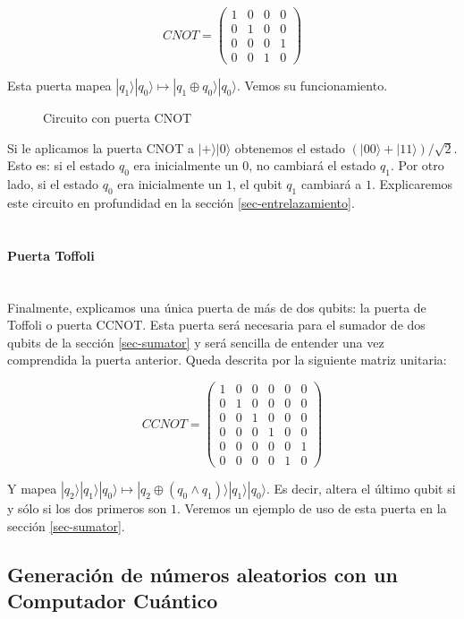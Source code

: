 \documentclass[11pt]{article}
\newcommand{\ra}{\rangle}
\newcommand{\myparagraph}[1]{\paragraph*{ \\ #1}\mbox{}\\}
\theoremstyle{plain}
\begin{document}
\[
	CNOT =
	\begin{pmatrix}
	1 & 0 & 0 & 0 \\
	0 & 1 & 0 & 0 \\
	0 & 0 & 0 & 1 \\
	0 & 0 & 1 & 0
	\end{pmatrix}
\]

Esta puerta mapea $|q_1\ra|q_0\ra \mapsto |q_1 \oplus q_0\ra|q_0\ra$. Vemos su funcionamiento.

\begin{figure}[H]
	\centering
	\caption{Circuito con puerta CNOT}
\end{figure}

Si le aplicamos la puerta CNOT a $|+\ra|0\ra$ obtenemos el estado $(|00\ra + |11\ra)/\sqrt 2$. Esto es: si el estado $q_0$ era inicialmente un $0$, no cambiará el estado $q_1$. Por otro lado, si el estado $q_0$ era inicialmente un $1$, el qubit $q_1$ cambiará a $1$. Explicaremos este circuito en profundidad en la sección \ref{sec-entrelazamiento}.


\myparagraph{Puerta Toffoli}


Finalmente, explicamos una única puerta de más de dos qubits: la puerta de Toffoli o puerta CCNOT. Esta puerta será necesaria para el sumador de dos qubits de la sección \ref{sec-sumator} y será sencilla de entender una vez comprendida la puerta anterior. Queda descrita por la siguiente matriz unitaria:

\[
	CCNOT =
	\begin{pmatrix}
	1 & 0 & 0 & 0 & 0 & 0 \\
	0 & 1 & 0 & 0 & 0 & 0 \\
	0 & 0 & 1 & 0 & 0 & 0 \\
	0 & 0 & 0 & 1 & 0 & 0 \\
	0 & 0 & 0 & 0 & 0 & 1 \\
	0 & 0 & 0 & 0 & 1 & 0
	\end{pmatrix}
\]

Y mapea $|q_2\ra|q_1\ra|q_0\ra \mapsto |q_2 \oplus (q_0 \wedge q_1)\ra|q_1\ra|q_0\ra$. Es decir, altera el último qubit si y sólo si los dos primeros son $1$. Veremos un ejemplo de uso de esta puerta en la sección \ref{sec-sumator}.


\subsection{Generación de números aleatorios con un Computador Cuántico}
\end{document}
